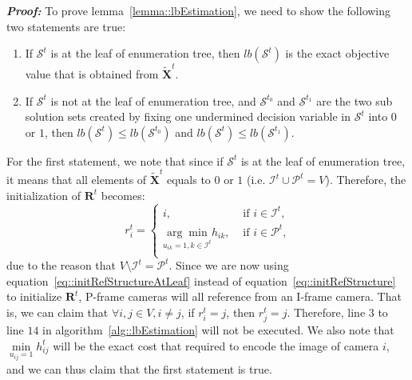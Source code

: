 \textbf{\emph{Proof:}}
To prove lemma~\ref{lemma::lbEstimation}, we need to show the following two statements are true:
\begin{enumerate}
\item If $\mathcal{S}^t$ is at the leaf of enumeration tree, then $lb(\mathcal{S}^t)$ is the exact objective value that is obtained from $\tilde{\mathbf{X}}^t$.
\item If $\mathcal{S}^t$ is not at the leaf of enumeration tree, and $\mathcal{S}^{t_0}$ and $\mathcal{S}^{t_1}$ are the two sub solution sets created by fixing one undermined decision variable in $\mathcal{S}^t$ into $0$ or $1$, then $lb(\mathcal{S}^t) \leq lb(\mathcal{S}^{t_0})$ and $lb(\mathcal{S}^t) \leq lb(\mathcal{S}^{t_1})$.
\end{enumerate}
For the first statement, we note that since if $\mathcal{S}^t$ is at the leaf of enumeration tree, it means that all elements of $\tilde{\mathbf{X}}^t$ equals to $0$ or $1$ (i.e. $\mathcal{I}^t \cup \mathcal{P}^t = V$).
Therefore, the initialization of $\mathbf{R}^t$ becomes:
\begin{equation}
r_i^t = 
\left\{ \begin{array}{cc}
i,  &\text{ if $i \in \mathcal{I}^t$,} \\                  	   
\underset{u_{ik}=1, k \in \mathcal{I}^t}{\arg\min} h_{ik},  &\text{ if $i \in \mathcal{P}^t$,} \\
\end{array} \right.
\label{eq::initRefStructureAtLeaf}
\end{equation}
due to the reason that $V \setminus \mathcal{I}^t = \mathcal{P}^t$.
Since we are now using equation~\eqref{eq::initRefStructureAtLeaf} instead of equation~\eqref{eq::initRefStructure} to initialize $\mathbf{R}^t$, P-frame cameras will all reference from an I-frame camera.
That is, we can claim that $\forall i,j \in V, i \neq j$, if $r_i^t = j$, then $r_j^t = j$.
Therefore, line $3$ to line $14$ in algorithm~\ref{alg::lbEstimation} will not be executed.
We also note that $\underset{u_{ij}=1}{\min} h_{ij}^t$ will be the exact cost that required to encode the image of camera $i$, and we can thus claim that the first statement is true.

